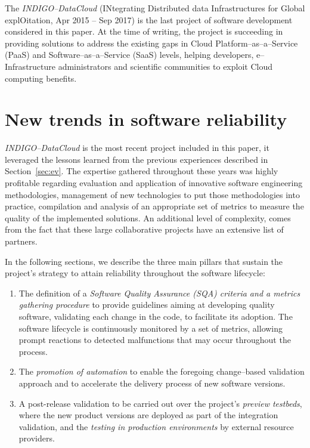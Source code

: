 \documentclass[journal]{IEEEtran}
\begin{document}
The {\sl INDIGO--DataCloud} (INtegrating Distributed data Infrastructures for Global
explOitation, Apr 2015 -- Sep 2017) \cite{cordis:indigo} is the last
project of software development considered in this paper. At the time of writing,
the project is succeeding in providing solutions to address the existing gaps in
Cloud Platform--as--a--Service (PaaS) and Software--as--a--Service (SaaS) levels,
helping developers, e--Infrastructure administrators and scientific communities to exploit
Cloud computing benefits.

\section{New trends in software reliability}
\label{sec:ntsr}

{\sl INDIGO--DataCloud} is the most recent project included in this paper, it
leveraged the lessons learned from the previous experiences described in
Section~\ref{sec:ev}. The expertise gathered throughout these years was highly
profitable regarding evaluation and application of innovative software engineering
methodologies, management of new technologies to put those methodologies
into practice, compilation and analysis of an appropriate set of metrics to measure the
quality of the implemented solutions.
An additional level of complexity, comes from the fact that these large collaborative projects
have an extensive list of partners.

In the following sections, we describe the three main pillars that sustain the project's strategy to attain reliability throughout the software lifecycle:

\begin{enumerate}
    \item The definition of a \textit{Software Quality Assurance (SQA) criteria and a metrics gathering procedure} to provide guidelines
    aiming at developing quality software, validating each change in the code, to facilitate its adoption. The software lifecycle is
    continuously monitored by a set of metrics, allowing prompt reactions to detected malfunctions that may occur throughout the process.
    \item The \textit{promotion of automation} to enable the foregoing change--based validation approach and to accelerate the delivery
    process of new software versions.
    \item A post-release validation to be carried out over the project's \textit{preview testbeds}, where the new product versions
    are deployed as part of the integration validation, and the \textit{testing in production environments} by external resource providers.
\end{enumerate}
\end{document}
